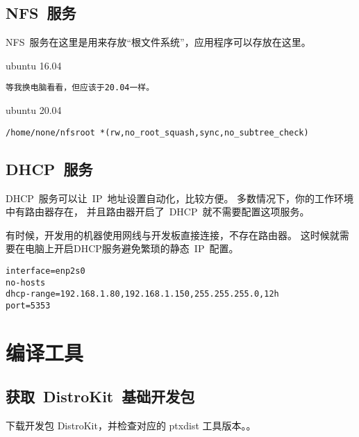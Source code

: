 \section{NFS~服务}
NFS~服务在这里是用来存放``根文件系统''，应用程序可以存放在这里。

ubuntu 16.04
\begin{lstlisting}
等我换电脑看看，但应该于20.04一样。
\end{lstlisting}
  

ubuntu 20.04
\begin{lstlisting}
/home/none/nfsroot *(rw,no_root_squash,sync,no_subtree_check)
\end{lstlisting}

\section{DHCP~服务}
DHCP~服务可以让~IP~地址设置自动化，比较方便。
多数情况下，你的工作环境中有路由器存在，
并且路由器开启了~DHCP~就不需要配置这项服务。

有时候，开发用的机器使用网线与开发板直接连接，不存在路由器。
这时候就需要在电脑上开启DHCP服务避免繁琐的静态~IP~配置。

\begin{lstlisting}
interface=enp2s0
no-hosts
dhcp-range=192.168.1.80,192.168.1.150,255.255.255.0,12h
port=5353
\end{lstlisting}


\chapter{编译工具}

\section{获取~DistroKit~基础开发包}

下载开发包 DistroKit，并检查对应的 ptxdist 工具版本。。

